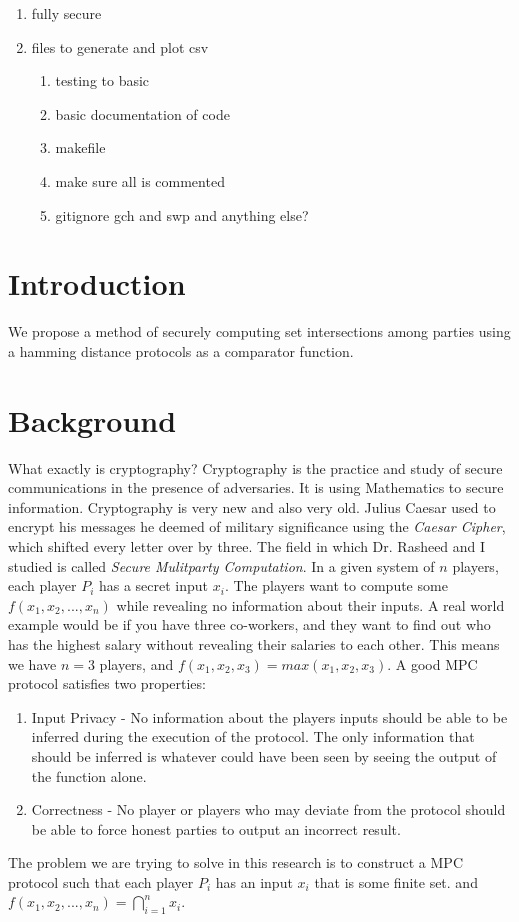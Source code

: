 \documentclass[12pt]{article}
\begin{document}
\begin{enumerate}
\begin{enumerate}
	\item fully secure
	\item files to generate and plot csv
		\begin{enumerate}
		\item testing to basic
		\item basic documentation of code
		\item makefile
		\item make sure all is commented
		\item gitignore gch and swp and anything else?
		\end{enumerate}
	\end{enumerate}
\end{enumerate}

\newpage

\section{Introduction}
We propose a method of securely computing set intersections among parties using a hamming distance protocols as a comparator function. 
\section{Background}

What exactly is cryptography? Cryptography is the practice and study of secure communications in the presence of adversaries. It is using Mathematics to secure information. Cryptography is very new and also very old. Julius Caesar used to encrypt his messages he deemed of military significance using the \textit{Caesar Cipher}, which shifted every letter over by three. The field in which Dr. Rasheed and I studied is called \textit{Secure Mulitparty Computation}. In a given system of $n$ players, each player $P_i$ has a secret input $x_i$. The players want to compute some $f(x_1,x_2,...,x_n)$ while revealing no information about their inputs. A real world example would be if you have three co-workers, and they want to find out who has the highest salary without revealing their salaries to each other. This means we have $n=3$ players, and $f(x_1,x_2,x_3) = max(x_1,x_2,x_3)$. A good MPC protocol satisfies two properties:
\begin{enumerate}
\item Input Privacy - No information about the players inputs should be able to be inferred during the execution of the protocol. The only information that should be inferred is whatever could have been seen by seeing the output of the function alone.
\item Correctness - No player or players who may deviate from the protocol should be able to force honest parties to output an incorrect result.  
\end{enumerate} 
The problem we are trying to solve in this research is to construct a MPC protocol such that each player $P_i$ has an input $x_i$ that is some finite set. and $f(x_1,x_2,...,x_n) = \bigcap_{i=1}^n x_i$. 
\end{document}
